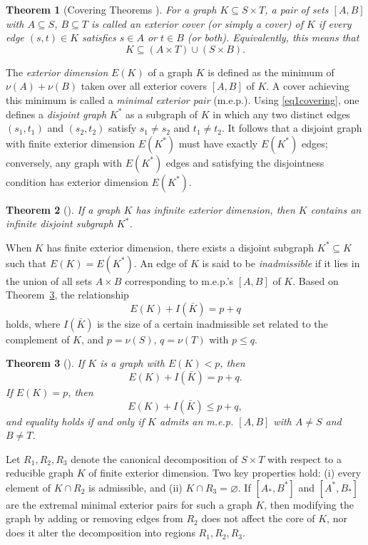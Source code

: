 \documentclass{article}
\newtheorem{theorem}{Theorem}[section]
\theoremstyle{definition}
\begin{document}
\begin{theorem}[Covering Theorems \cite{Mendelsohn58Dulmage}]\label{thm1covering}
For a graph $K \subseteq S \times T$, a pair of sets $[A,B]$ with $A \subseteq S$, $B \subseteq T$ is called an \emph{exterior cover} (or simply a cover) of $K$ if every edge $(s,t) \in K$ satisfies $s \in A$ or $t \in B$ (or both). Equivalently, this means that
\begin{equation}\label{eq1covering}
K \subseteq (A \times T) \cup (S \times B).
\end{equation}
\end{theorem}

The \emph{exterior dimension} $E(K)$ of a graph $K$ is defined as the minimum of $\nu(A) + \nu(B)$ taken over all exterior covers $[A,B]$ of $K$. A cover achieving this minimum is called a \emph{minimal exterior pair} (m.e.p.). Using \eqref{eq1covering}, one defines a \emph{disjoint graph} $K^{*}$ as a subgraph of $K$ in which any two distinct edges $(s_1, t_1)$ and $(s_2, t_2)$ satisfy $s_1 \neq s_2$ and $t_1 \neq t_2$. It follows that a disjoint graph with finite exterior dimension $E(K^{*})$ must have exactly $E(K^{*})$ edges; conversely, any graph with $E(K^{*})$ edges and satisfying the disjointness condition has exterior dimension $E(K^{*})$.

\begin{theorem}[\cite{Mendelsohn58Dulmage}]
If a graph $K$ has infinite exterior dimension, then $K$ contains an infinite disjoint subgraph $K^{*}$.
\end{theorem}

When $K$ has finite exterior dimension, there exists a disjoint subgraph $K^{*} \subseteq K$ such that $E(K) = E(K^{*})$. An edge of $K$ is said to be \emph{inadmissible} if it lies in the union of all sets $A \times B$ corresponding to m.e.p.'s $[A,B]$ of $K$. Based on Theorem~\ref{thm2covering}, the relationship
\[
E(K) + I(\bar{K}) = p + q
\]
holds, where $I(\bar{K})$ is the size of a certain inadmissible set related to the complement of $K$, and $p = \nu(S)$, $q = \nu(T)$ with $p \le q$.

\begin{theorem}[\cite{Mendelsohn58Dulmage}]\label{thm2covering}
If $K$ is a graph with $E(K) < p$, then
\[
E(K) + I(\bar{K}) = p + q.
\]
If $E(K) = p$, then
\[
E(K) + I(\bar{K}) \le p + q,
\]
and equality holds if and only if $K$ admits an m.e.p. $[A,B]$ with $A \ne S$ and $B \ne T$.
\end{theorem}

Let $R_1, R_2, R_3$ denote the canonical decomposition of $S \times T$ with respect to a reducible graph $K$ of finite exterior dimension. Two key properties hold: (i) every element of $K \cap R_2$ is admissible, and (ii) $K \cap R_3 = \varnothing$. If $\left[A_*, B^{*}\right]$ and $\left[A^{*}, B_{*}\right]$ are the extremal minimal exterior pairs for such a graph $K$, then modifying the graph by adding or removing edges from $R_2$ does not affect the core of $K$, nor does it alter the decomposition into regions $R_1, R_2, R_3$.
\end{document}

